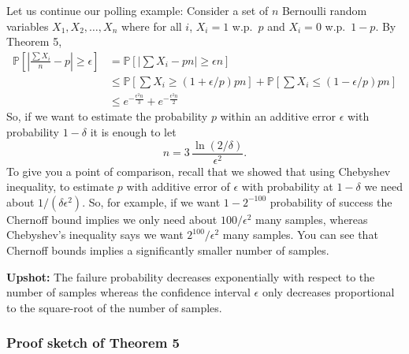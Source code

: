 Let us continue our polling example: Consider a set of $n$ Bernoulli random variables $X_1,X_2,\ldots,X_n$ where for all $i$, $X_i=1$ w.p.\ $p$ and $X_i=0$ w.p.\ $1-p$. By Theorem 5,
\begin{align*}
  \mathbb{P}\left[\left|\frac{\sum X_i}{n}-p\right|\ge\epsilon\right]
  &= \mathbb{P}\left[\left|\sum X_i-pn\right|\ge\epsilon n\right]\\
  &\le \mathbb{P}\left[\sum X_i\ge(1+\epsilon/p)pn\right]+\mathbb{P}\left[\sum X_i\le(1-\epsilon/p)pn\right]\\
  &\le e^{-\frac{\epsilon^2 n}{3}}+e^{-\frac{\epsilon^2 n}{2}}
\end{align*}
So, if we want to estimate the probability $p$ within an additive error $\epsilon$ with probability $1-\delta$ it is enough to let
\[
  n = 3\,\frac{\ln(2/\delta)}{\epsilon^2}.
\]
To give you a point of comparison, recall that we showed that using Chebyshev inequality, to estimate $p$ with additive error of $\epsilon$ with probability at $1-\delta$ we need about $1/(\delta\epsilon^2)$. So, for example, if we want $1-2^{-100}$ probability of success the Chernoff bound implies we only need about $100/\epsilon^2$ many samples, whereas Chebyshev's inequality says we want $2^{100}/\epsilon^2$ many samples. You can see that Chernoff bounds implies a significantly smaller number of samples.

\medskip
\noindent\textbf{Upshot:} The failure probability decreases exponentially with respect to the number of samples whereas the confidence interval $\epsilon$ only decreases proportional to the square-root of the number of samples.

\subsubsection{Proof sketch of Theorem 5}


